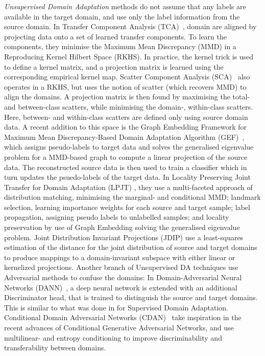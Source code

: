 \documentclass[journal]{IEEEtran}
\begin{document}
\textit{Unsupervised Domain Adaptation} methods do not assume that any labels are available in the target domain, and use only the label information from the source domain. 
In Transfer Component Analysis (TCA)~\cite{pan2010tca}, domain are aligned by projecting data onto a set of learned transfer components. To learn the components, they minimise the Maximum Mean Discrepancy (MMD) in a Reproducing Kernel Hilbert Space (RKHS). In practice, the kernel trick is used to define a kernel matrix, and a projection matrix is learned using the corresponding empirical kernel map.
Scatter Component Analysis (SCA)~\cite{ghifary2017sca} also operates in a RKHS, but uses the notion of scatter (which recovers MMD) to align the domains. A projection matrix is then found by maximising the total- and between-class scatters, while minimising the domain-, within-class scatters. Here, between- and within-class scatters are defined only using source domain data.
A recent addition to this space is the Graph Embedding Framework for Maximum Mean Discrepancy-Based Domain Adaptation Algorithm (GEF)~\cite{chen2019gef}, which assigns pseudo-labels to target data and solves the generalised eigenvalue problem for a MMD-based graph to compute a linear projection of the source data. The reconstructed source data is then used to train a classifier which in turn updates the psuedo-labels of the target data. 
In Locality Preserving Joint Transfer for Domain Adaptation (LPJT) \cite{li2019locality}, they use a multi-faceted approach of distribution matching, minimising the marginal- and conditional MMD; landmark selection, learning importance weights for each source and target sample; label propagation, assigning pseudo labels to unlabelled samples; and locality preservation by use of Graph Embedding solving the generalised eigenvalue problem.
Joint Distribution Invariant Projections (JDIP) \cite{chen2020domain} use a least-squares estimation of the  distance for the joint distribution of source and target domains to produce mappings to a domain-invariant subspace with either linear or kernelized projections.
Another branch of Unsupervised DA techniques use Adversarial methods to confuse the domains: In Domain-Adversarial Neural Networks (DANN)~\cite{ganin2016domain}, a deep neural network is extended with an additional Discriminator head, that is trained to distinguish the source and target domains. This is similar to what was done in \cite{tzeng2015simultaneous} for Supervised Domain Adaptation. 
Conditional Domain Adversarial Networks (CDAN)~\cite{long2018conditional} take inspiration in the recent advances of Conditional Generative Adversarial Networks, and use multilinear- and entropy conditioning to improve discriminability and transferability between domains.
\end{document}
